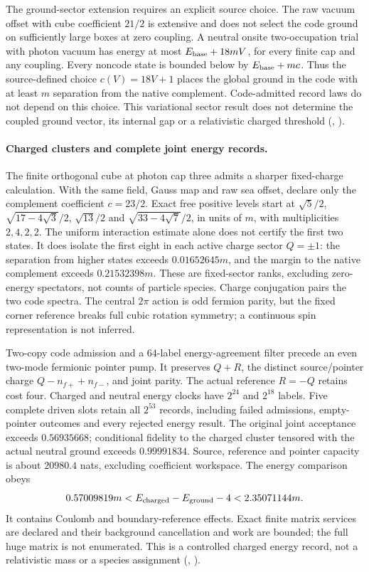 The ground-sector extension requires an explicit source choice.
The raw vacuum offset with cube coefficient $21/2$ is extensive and does
not select the code ground on sufficiently large boxes at zero coupling. A neutral onsite two-occupation trial with photon vacuum
has energy at most $E_{\rm base}+18mV$, for every finite cap and any
coupling. Every noncode state is bounded below by $E_{\rm base}+mc$.
Thus the source-defined choice $c(V)=18V+1$ places the global ground in
the code with at least $m$ separation from the native complement.
Code-admitted record laws do not depend on this choice. This variational sector result
does not determine the coupled ground vector, its internal gap or a
relativistic charged threshold
(, \cite{ophrepo}).

\paragraph{Charged clusters and complete joint energy records.}
The finite orthogonal cube at photon cap three admits a sharper fixed-charge
calculation. With the same field, Gauss map and raw sea offset, declare
only the complement coefficient $c=23/2$. Exact free positive levels start at
$\sqrt5/2$, $\sqrt{17-4\sqrt3}/2$, $\sqrt{13}/2$ and
$\sqrt{33-4\sqrt7}/2$, in units of $m$, with multiplicities $2,4,2,2$.
The uniform interaction estimate alone does not certify the first two states.
It does isolate the first eight in each active charge sector $Q=\pm1$:
the separation from higher states exceeds $0.01652645m$, and the margin
to the native complement exceeds $0.21532398m$. These are fixed-sector
ranks, excluding zero-energy spectators, not counts of particle species.
Charge conjugation pairs the two code spectra. The central $2\pi$ action
is odd fermion parity, but the fixed corner reference breaks full cubic
rotation symmetry; a continuous spin representation is not inferred.

Two-copy code admission and a $64$-label energy-agreement filter precede
an even two-mode fermionic pointer pump. It preserves $Q+R$, the distinct
source/pointer charge $Q-n_{f+}+n_{f-}$, and joint parity. The actual
reference $R=-Q$ retains cost four. Charged and neutral energy clocks have
$2^{24}$ and $2^{18}$ labels. Five complete driven slots retain all
$2^{53}$ records, including failed admissions, empty-pointer outcomes
and every rejected energy result. The original joint acceptance exceeds
$0.56935668$; conditional fidelity to the charged cluster tensored with
the actual neutral ground exceeds $0.99991834$. Source, reference and
pointer capacity is about $20980.4$ nats, excluding coefficient workspace.
The energy comparison obeys
\[
 0.57009819m<E_{\rm charged}-E_{\rm ground}-4<2.35071144m.
\]
It contains Coulomb and boundary-reference effects. Exact finite
matrix services are declared and their background cancellation and work
are bounded; the full huge matrix is not enumerated. This is a controlled
charged energy record, not a relativistic mass or a species assignment
(, \cite{ophrepo}).

